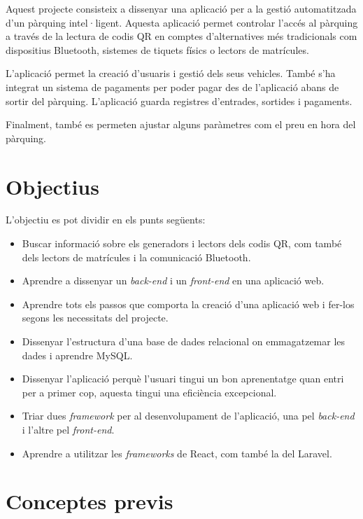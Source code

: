 Aquest projecte consisteix a dissenyar una aplicació per a la gestió automatitzada d'un pàrquing intel·ligent.
Aquesta aplicació permet controlar l'accés al pàrquing a través de la lectura de codis QR en comptes d'alternatives
més tradicionals com dispositius Bluetooth, sistemes de tiquets físics o lectors de matrícules.

L'aplicació permet la creació d'usuaris i gestió dels seus vehicles. També s'ha integrat un sistema
de pagaments per poder pagar des de l'aplicació abans de sortir del pàrquing. L'aplicació guarda registres
d'entrades, sortides i pagaments.

Finalment, també es permeten ajustar alguns paràmetres com el preu en hora del pàrquing.

\section{Objectius}

L'objectiu es pot dividir en els punts següents:

\begin{itemize}
    \item Buscar informació sobre els generadors i lectors dels codis QR, com també dels lectors de matrícules i la comunicació Bluetooth.
    \item Aprendre a dissenyar un \emph{back-end} i un \emph{front-end} en una aplicació web.
    \item Aprendre tots els passos que comporta la creació d'una aplicació web i fer-los segons les necessitats del projecte.
    \item Dissenyar l'estructura d'una base de dades relacional on emmagatzemar les dades i aprendre MySQL.
    \item Dissenyar l'aplicació perquè l'usuari tingui un bon aprenentatge quan entri per a primer cop, aquesta tingui una eficiència excepcional.
    \item Triar dues \emph{framework} per al desenvolupament de l'aplicació, una pel \emph{back-end} i l'altre pel \emph{front-end}.
    \item Aprendre a utilitzar les \emph{frameworks} de React, com també la del Laravel.
\end{itemize}

\section{Conceptes previs}

